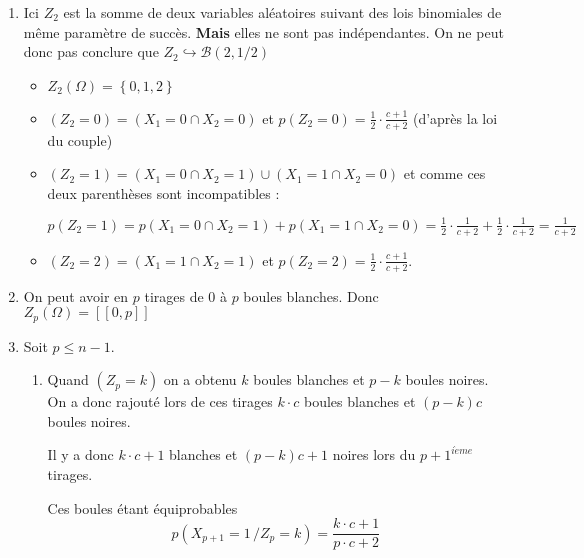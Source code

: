 \begin{correction}
\begin{enumerate}
\item Ici $Z_{2}$ est la somme de deux variables al\'{e}atoires suivant des
lois binomiales de m\^{e}me param\`{e}tre de succ\`{e}s. \textbf{Mais }elles
ne sont pas ind\'{e}pendantes. On ne peut donc pas conclure que $%
Z_{2}\hookrightarrow \mathcal{B}\left( 2,1/2\right) $

\begin{itemize}
\item $Z_{2}\left( \Omega \right) =\left\{ 0,1,2\right\} $

\item $\left( Z_{2}=0\right) =\left( X_{1}=0\cap X_{2}=0\right) $ et $%
p\left( Z_{2}=0\right) =\displaystyle
\frac{1}{2}\cdot \frac{c+1}{c+2}$ (d'apr\`{e}s la loi du couple)

\item $\left( Z_{2}=1\right) =\left( X_{1}=0\cap X_{2}=1\right) \cup \left(
X_{1}=1\cap X_{2}=0\right) $ et comme ces deux parenth\`{e}ses sont
incompatibles :

$p\left( Z_{2}=1\right) =p\left( X_{1}=0\cap X_{2}=1\right) +p\left(
X_{1}=1\cap X_{2}=0\right) =\displaystyle
\frac{1}{2}\cdot \frac{1}{c+2}+\frac{1}{2}\cdot \frac{1}{c+2}=\frac{1}{c+2}$

\item $\left( Z_{2}=2\right) =\left( X_{1}=1\cap X_{2}=1\right) $ et $%
p\left( Z_{2}=2\right) =\displaystyle
\frac{1}{2}\cdot \frac{c+1}{c+2}$.
\end{itemize}

\item On peut avoir en $p$ tirages de 0 \`{a} $p$ boules blanches. Donc $%
Z_{p}\left( \Omega \right) =\left[ \left[ 0,p\right] \right] $

\item Soit $p\leqslant n-1$.

\begin{enumerate}
\item Quand $\left( Z_{p}=k\right) $ on a obtenu $k$ boules blanches et $p-k 
$ boules noires. On a donc rajout\'{e} lors de ces tirages $k\cdot c$ boules
blanches et $\left( p-k\right) c$ boules noires.

Il y a donc $k\cdot c+1$ blanches et $\left( p-k\right) c+1$ noires lors du $%
p+1^{i\grave{e}me}$ tirages$.$

Ces boules \'{e}tant \'{e}quiprobables 
\begin{equation*}
p(X_{p+1}=1\,/Z_{p}=k)=\frac{k\cdot c+1}{p\cdot c+2}
\end{equation*}


\end{enumerate}
\end{enumerate}
\end{correction}
